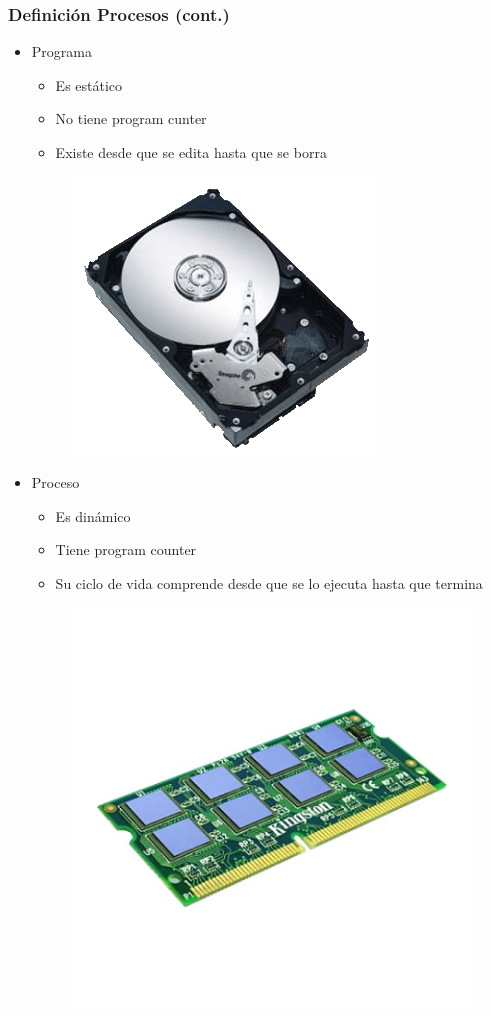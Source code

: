 \begin{frame}
  \frametitle{Definición Procesos (cont.)}
  \begin{itemize}
	  \item Programa
	  \begin{itemize}
	  	\item Es estático
	  	\item No tiene program cunter
	  	\item Existe desde que se edita hasta que se borra
	  \end{itemize}
	  \begin{figure}
		    \includegraphics[scale=0.1]{images/program.png}
	  \end{figure}
	  \item Proceso
	  \begin{itemize}
	  	\item Es dinámico
	  	\item Tiene program counter
	  	\item Su ciclo de vida comprende desde que se lo ejecuta hasta que termina
	  \end{itemize}
	  \begin{figure}			
			\includegraphics[scale=0.1]{images/process.png}
	  \end{figure}	  
  \end{itemize}
\end{frame}

